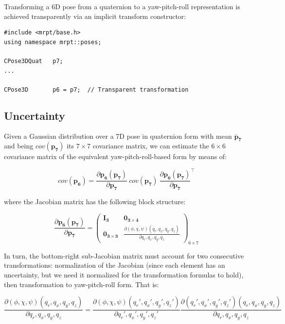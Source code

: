 \documentclass[a4paper,10pt]{report}
\begin{document}
Transforming a 6D pose from a quaternion to a yaw-pitch-roll representation is 
achieved transparently via an implicit transform constructor:

\begin{lstlisting}
#include <mrpt/base.h> 
using namespace mrpt::poses; 

CPose3DQuat   p7;
...

CPose3D       p6 = p7;  // Transparent transformation
\end{lstlisting}



\subsection{Uncertainty}

Given a Gaussian distribution over a 7D pose in quaternion form with 
mean ${\mathbf{\bar{p}_7}}$ and being $cov(\mathbf{p_7})$ its $7 \times 7$ covariance matrix, 
we can estimate the $6 \times 6$ covariance matrix of the equivalent yaw-pitch-roll-based 
form by means of:

\begin{equation}
cov(\mathbf{p_6}) =
\frac{\partial \mathbf{p_6}(\mathbf{p_7}) }{\partial \mathbf{p_7}} ~ 
cov(\mathbf{p_7})  ~
\frac{\partial \mathbf{p_6}(\mathbf{p_7}) }{\partial \mathbf{p_7}}^\top 
\end{equation}

\noindent where the Jacobian matrix has the following block structure:

\begin{equation}
\frac{\partial \mathbf{p_6}(\mathbf{p_7}) }{\partial \mathbf{p_7}} =
\left(
\begin{array}{c|c}
 \mathbf{I_3} & \mathbf{0_{3\times 4}} \\ \hline
 \mathbf{0_{3\times 3}} &  \frac{\partial (\phi,\chi,\psi)(q_r,q_x,q_y,q_z)}{\partial q_r,q_x,q_y,q_z}
\end{array}
\right)_{6 \times 7}
\end{equation}

In turn, the bottom-right sub-Jacobian matrix must account for two consecutive transformations: 
normalization of the Jacobian (since each element has an uncertainty, but we need it normalized
for the transformation formulas to hold), then transformation to yaw-pitch-roll form. That is:

\begin{equation}
\frac{\partial (\phi,\chi,\psi)(q_r,q_x,q_y,q_z)}{\partial q_r,q_x,q_y,q_z} =
\frac{\partial (\phi,\chi,\psi)(q_r',q_x',q_y',q_z')}{\partial q_r',q_x',q_y',q_z'}
\frac{\partial (q_r',q_x',q_y',q_z')(q_r,q_x,q_y,q_z)}{\partial q_r,q_x,q_y,q_z}  
\end{equation}
\end{document}
